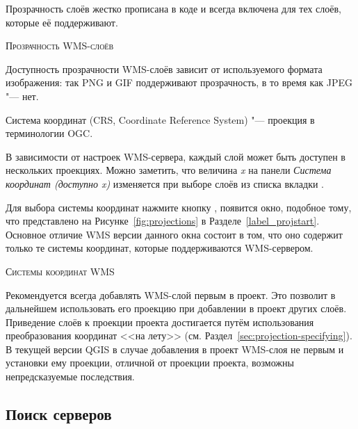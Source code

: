 \label{ogc-wms-transparency}

Прозрачность слоёв жестко прописана в коде и всегда включена для тех
слоёв, которые её поддерживают.

\begin{Tip}[ht]\caption{\textsc{Прозрачность WMS-слоёв}}
Доступность прозрачности WMS-слоёв зависит от используемого формата изображения:
так PNG и GIF поддерживают прозрачность, в то время как JPEG "--- нет.
\end{Tip}


Система координат (CRS, Coordinate Reference System) "--- проекция в
терминологии OGC.

В зависимости от настроек WMS-сервера, каждый слой может быть доступен в
нескольких проекциях. Можно заметить, что величина \textsl{x}
на панели \textsl{Система координат (доступно x)}
изменяется при выборе слоёв из списка вкладки .

Для выбора системы координат нажмите кнопку , появится
окно, подобное тому, что представлено на Рисунке~\ref{fig:projections} в
Разделе~\ref{label_projstart}. Основное отличие WMS версии данного окна
состоит в том, что оно содержит только те системы координат, которые
поддерживаются WMS-сервером.

\begin{Tip}[ht]\caption{\textsc{Системы координат WMS}}
Рекомендуется всегда добавлять WMS-слой первым в проект. Это позволит в
дальнейшем использовать его проекцию при добавлении в проект других слоёв.
Приведение слоёв к проекции проекта достигается путём использования
преобразования координат <<на лету>> (см. Раздел~\ref{sec:projection-specifying}).
В текущей версии QGIS в случае добавления в проект WMS-слоя не первым и
установки ему проекции, отличной от проекции проекта, возможны
непредсказуемые последствия.
\end{Tip}

%
%
\subsection{Поиск серверов}
\label{sec:serversearch}

